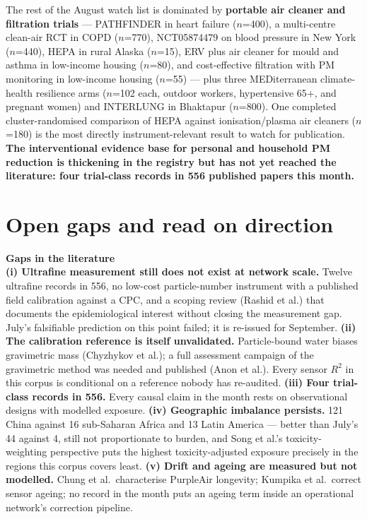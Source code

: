\documentclass[10pt]{article}
\begin{document}
\vspace{1.5mm}
The rest of the August watch list is dominated by \textbf{portable air cleaner and
filtration trials} --- PATHFINDER in heart failure ($n$=400), a multi-centre clean-air RCT
in COPD ($n$=770), NCT05874479 on blood pressure in New York ($n$=440), HEPA in rural
Alaska ($n$=15), ERV plus air cleaner for mould and asthma in low-income housing
($n$=80), and cost-effective filtration with PM monitoring in low-income housing
($n$=55) --- plus three MEDiterranean climate-health resilience arms ($n$=102 each,
outdoor workers, hypertensive 65+, and pregnant women) and INTERLUNG in Bhaktapur
($n$=800). One completed cluster-randomised comparison of HEPA against ionisation/plasma
air cleaners ($n$=180) is the most directly instrument-relevant result to watch for
publication. \textbf{The interventional evidence base for personal and household PM
reduction is thickening in the registry but has not yet reached the literature: four
trial-class records in 556 published papers this month.}

\vspace{4mm}

\section*{\sffamily\bfseries\color{Deep}Open gaps and read on direction}
\vspace{-1.5mm}{\color{Coral}\rule{\linewidth}{1.1pt}}\vspace{2.5mm}

\begin{keybox}
{\sffamily\bfseries\footnotesize\color{Deep}Gaps in the literature}\\[1.2mm]
\footnotesize
\textbf{(i) Ultrafine measurement still does not exist at network scale.} Twelve
ultrafine records in 556, no low-cost particle-number instrument with a published field
calibration against a CPC, and a scoping review (Rashid et al.) that documents the
epidemiological interest without closing the measurement gap. July's falsifiable
prediction on this point failed; it is re-issued for September.
\textbf{(ii) The calibration reference is itself unvalidated.} Particle-bound water
biases gravimetric mass (Chyzhykov et al.); a full assessment campaign of the gravimetric
method was needed and published (Anon et al.). Every sensor $R^2$ in this corpus is
conditional on a reference nobody has re-audited.
\textbf{(iii) Four trial-class records in 556.} Every causal claim in the month rests on
observational designs with modelled exposure.
\textbf{(iv) Geographic imbalance persists.} 121 China against 16 sub-Saharan Africa and
13 Latin America --- better than July's 44 against 4, still not proportionate to burden,
and Song et al.'s toxicity-weighting perspective puts the highest toxicity-adjusted
exposure precisely in the regions this corpus covers least.
\textbf{(v) Drift and ageing are measured but not modelled.} Chung et al.\ characterise
PurpleAir longevity; Kumpika et al.\ correct sensor ageing; no record in the month puts
an ageing term inside an operational network's correction pipeline.
\end{keybox}
\end{document}

